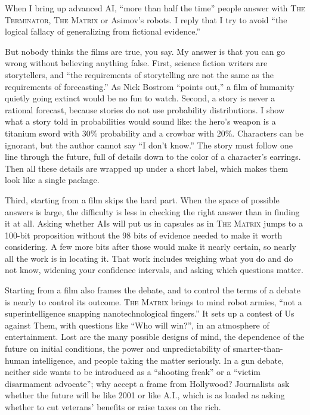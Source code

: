
When I bring up advanced AI, ``more than half the time'' people answer with \textsc{The Terminator}, \textsc{The Matrix} or Asimov's robots. I reply that I try to avoid ``the logical fallacy of generalizing from fictional evidence.'' 

But nobody thinks the films are true, you say. My answer is that you can go wrong without believing anything false. First, science fiction writers are storytellers, and ``the requirements of storytelling are not the same as the requirements of forecasting.'' As Nick Bostrom ``points out,'' a film of humanity quietly going extinct would be no fun to watch.  Second, a story is never a rational forecast, because stories do not use probability distributions. I show what a story told in probabilities would sound like: the hero's weapon is a titanium sword with 30\% probability and a crowbar with 20\%. Characters can be ignorant, but the author cannot say ``I don't know.'' The story must follow one line through the future, full of details down to the color of a character's earrings. Then all these details are wrapped up under a short label, which makes them look like a single package.

Third, starting from a film skips the hard part. When the space of possible answers is large, the difficulty is less in checking the right answer than in finding it at all. Asking whether AIs will put us in capsules as in \textsc{The Matrix} jumps to a 100-bit proposition without the 98 bits of evidence needed to make it worth considering. A few more bits after those would make it nearly certain, so nearly all the work is in locating it. That work includes weighing what you do and do not know, widening your confidence intervals, and asking which questions matter.

Starting from a film also frames the debate, and to control the terms of a debate is nearly to control its outcome. \textsc{The Matrix} brings to mind robot armies, ``not a superintelligence snapping nanotechnological fingers.''  It sets up a contest of Us against Them, with questions like ``Who will win?'', in an atmosphere of entertainment. Lost are the many possible designs of mind, the dependence of the future on initial conditions, the power and unpredictability of smarter-than-human intelligence, and people taking the matter seriously. In a gun debate, neither side wants to be introduced as a ``shooting freak'' or a ``victim disarmament advocate''; why accept a frame from Hollywood? Journalists ask whether the future will be like \textsc{2001} or like \textsc{A.I.}, which is as loaded as asking whether to cut veterans' benefits or raise taxes on the rich.

